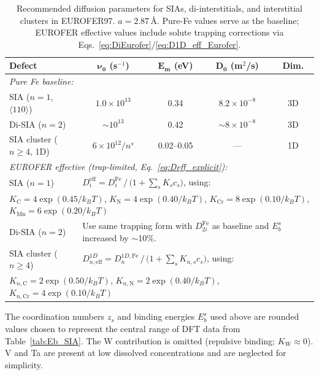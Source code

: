 \documentclass[pdflatex,sn-basic]{sn-jnl} %
\begin{document}
\begin{table}[htbp]
\centering
\caption{Recommended diffusion parameters for SIAs, di-interstitials, and
interstitial clusters in EUROFER97. $a = 2.87$\,\AA. Pure-Fe values serve as
the baseline; EUROFER effective values include solute trapping corrections via
Eqs.~\eqref{eq:DiEurofer}/\eqref{eq:D1D_eff_Eurofer}.}
\label{tab:D_eurofer}
\renewcommand{\arraystretch}{1.3}
\begin{tabular}{@{}lcccc@{}}
\toprule
\textbf{Defect} & \textbf{$\bm{\nu_0}$ (s$^{-1}$)} & \textbf{$\bm{E_m}$ (eV)} & \textbf{$\bm{D_0}$ (m$^2$/s)} & \textbf{Dim.}\\
\midrule
\multicolumn{5}{l}{\emph{Pure Fe baseline:}} \\
SIA ($n=1$, $\langle110\rangle$)   & $1.0\times10^{13}$ & 0.34 & $8.2\times10^{-8}$ & 3D \\
Di-SIA ($n=2$)                      & $\sim10^{13}$       & 0.42 & $\sim8\times10^{-8}$ & 3D \\
SIA cluster ($n\geq4$, 1D)          & $6\times10^{12}/n^s$ & 0.02--0.05 & --- & 1D \\[6pt]

\multicolumn{5}{l}{\emph{EUROFER effective (trap-limited, Eq.~\ref{eq:Deff_explicit}):}} \\
SIA ($n=1$)  & \multicolumn{4}{l}{$D_i^{\mathrm{eff}} = D_i^{\mathrm{Fe}}\,\big/\,\big(1 + \sum_s K_s c_s\big)$, using:} \\
\multicolumn{5}{l}{\qquad
$K_{\mathrm{C}} = 4\exp(0.45/k_BT)$, \quad
$K_{\mathrm{N}} = 4\exp(0.40/k_BT)$, \quad
$K_{\mathrm{Cr}} = 8\exp(0.10/k_BT)$, \quad
$K_{\mathrm{Mn}} = 6\exp(0.20/k_BT)$} \\[4pt]
Di-SIA ($n=2$)  & \multicolumn{4}{l}{Use same trapping form with $D_{2i}^{\mathrm{Fe}}$ as baseline and $E_b^s$ increased by $\sim$10\%.} \\[4pt]
SIA cluster ($n\geq4$)  & \multicolumn{4}{l}{$D_{n,\mathrm{eff}}^{1D} = D_n^{1D,\mathrm{Fe}}\,\big/\,\big(1+\sum_s K_{n,s} c_s\big)$, using:} \\
\multicolumn{5}{l}{\qquad
$K_{n,\mathrm{C}} = 2\exp(0.50/k_BT)$, \quad
$K_{n,\mathrm{N}} = 2\exp(0.40/k_BT)$, \quad
$K_{n,\mathrm{Cr}} = 4\exp(0.10/k_BT)$} \\
\bottomrule
\end{tabular}
\end{table}

The coordination numbers $z_s$ and binding energies $E_b^s$ used above are
rounded values chosen to represent the central range of DFT data from
Table~\ref{tab:Eb_SIA}. The W contribution is omitted (repulsive binding;
$K_{\mathrm{W}} \approx 0$). V and Ta are present at low dissolved
concentrations and are neglected for simplicity.
\end{document}
